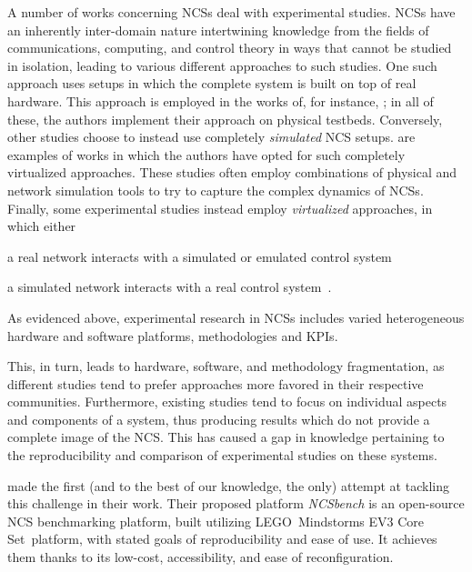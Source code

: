 A number of works concerning \acp{NCS} deal with experimental studies.
\acp{NCS} have an inherently inter-domain nature intertwining knowledge from the fields of communications, computing, and control theory in ways that cannot be studied in isolation, leading to various different approaches to such studies.
One such approach uses setups in which the complete system is built on top of real hardware.
This approach is employed in the works of, for instance, \textcite{Li2014Wireless,Baumann2018LowPower,Cuenca2019UAV}; in all of these, the authors implement their approach on physical testbeds.
Conversely, other studies choose to instead use completely \emph{simulated} \ac{NCS} setups.
\textcite{Wu2012NPC,Chen2015synccontrol,Ma2019DynamicSched} are examples of works in which the authors have opted for such completely virtualized approaches.
These studies often employ combinations of physical and network simulation tools to try to capture the complex dynamics of \acp{NCS}.
Finally, some experimental studies instead employ \emph{virtualized} approaches, in which either
\begin{enumerate*}[itemjoin={{; }}, itemjoin*={{; or }}]
    \item a real network interacts with a simulated or emulated control system~\cite{Wang2020VoltageControl}
    \item a simulated network interacts with a real control system~\cite{Natale2004InvPendEthernet}.
\end{enumerate*}

As evidenced above, experimental research in \acp{NCS} includes varied heterogeneous hardware and software platforms, methodologies and \aclp*{KPI}.

This, in turn, leads to hardware, software, and methodology fragmentation, as different studies tend to prefer approaches more favored in their respective communities.
Furthermore, existing studies tend to focus on individual aspects and components of a system, thus producing results which do not provide a complete image of the \ac{NCS}.
This has caused a gap in knowledge pertaining to the reproducibility and comparison of experimental studies on these systems.

\textcite{Zoppi2020NCSBench} made the first (and to the best of our knowledge, the only) attempt at tackling this challenge in their work.
Their proposed platform \emph{NCSbench} is an open-source \ac{NCS} benchmarking platform, built utilizing LEGO\textregistered{}\ Mindstorms EV3 Core Set\texttrademark{}\ platform, with stated goals of reproducibility and ease of use.
It achieves them thanks to its low-cost, accessibility, and ease of reconfiguration.

